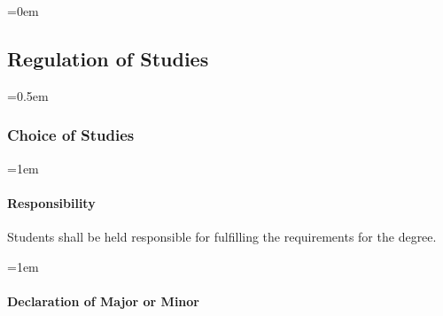 \documentclass{manual}
\let\oldsubsection\subsection
\renewcommand\subsection{\leftskip=0em\oldsubsection}
\let\oldsubsubsection\subsubsection
\renewcommand\subsubsection{\leftskip=0.5em\oldsubsubsection}
\let\oldparagraph\paragraph
\renewcommand\paragraph{\leftskip=1em\oldparagraph}
\begin{document}
\subsection{Regulation of Studies}\label{sec:RegulationOfStudies}


\subsubsection{Choice of Studies}\label{sub:ChoiceOfStudies}


\paragraph{Responsibility}

Students shall be held responsible for fulfilling the requirements for the degree.


\paragraph{Declaration of Major or Minor}
\end{document}
